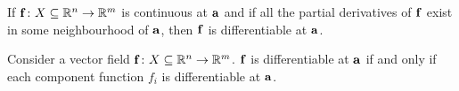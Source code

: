 \documentclass{article}
\begin{document}
\begin{theorem}
  If $\mathbf{f} \colon X \subseteq \mathbb{R}^n \to \mathbb{R}^m$ is continuous at $\mathbf{a}$ and if all the partial derivatives of $\mathbf{f}$ exist in some neighbourhood of $\mathbf{a}$, then $\mathbf{f}$ is differentiable at $\mathbf{a}$.
\end{theorem}

\begin{theorem}
  Consider a vector field $\mathbf{f} \colon X \subseteq \mathbb{R}^n \to \mathbb{R}^m$.
  $\mathbf{f}$ is differentiable at $\mathbf{a}$ if and only if each component function $f_i$ is differentiable at $\mathbf{a}$.
\end{theorem}
\end{document}

